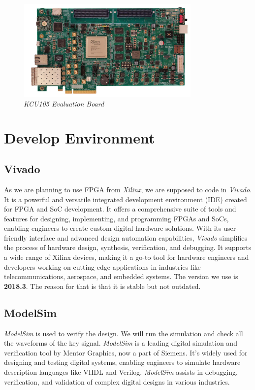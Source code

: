 \begin{figure}[!htbp]
    \centering
    \includegraphics[width=0.8\textwidth]{_IMAGES/KCU105_evaluation_board.png}
    \caption{\textit{KCU105 Evaluation Board}}
    \label{fig:kcu105}
\end{figure}

\section{Develop Environment}
\subsection{Vivado}
As we are planning to use FPGA from \textit{Xilinx}, we are supposed to code in \textit{Vivado}. It is a powerful and versatile integrated development environment (IDE) created for FPGA and SoC development. It offers a comprehensive suite of tools and features for designing, implementing, and programming FPGAs and SoCs, enabling engineers to create custom digital hardware solutions. With its user-friendly interface and advanced design automation capabilities, \textit{Vivado} simplifies the process of hardware design, synthesis, verification, and debugging. It supports a wide range of Xilinx devices, making it a go-to tool for hardware engineers and developers working on cutting-edge applications in industries like telecommunications, aerospace, and embedded systems. The version we use is \textbf{2018.3}. The reason for that is that it is stable but not outdated.

\subsection{ModelSim}
\textit{ModelSim} is used to verify the design. We will run the simulation and check all the waveforms of the key signal. \textit{ModelSim} is a leading digital simulation and verification tool by Mentor Graphics, now a part of Siemens. It's widely used for designing and testing digital systems, enabling engineers to simulate hardware description languages like VHDL and Verilog. \textit{ModelSim} assists in debugging, verification, and validation of complex digital designs in various industries.

